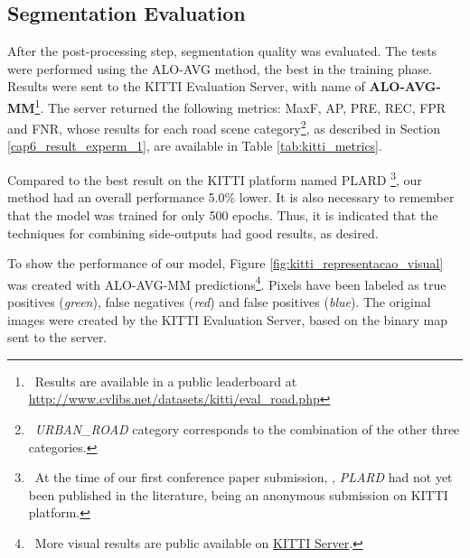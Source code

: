 \subsection{Segmentation Evaluation}
\label{cap6_resultados_segmentacao}

After the post-processing step, segmentation quality was evaluated.
The tests were performed using the ALO-AVG method, the best in the training phase.
Results were sent to  the KITTI Evaluation Server, with name of \textbf{ALO-AVG-MM}\footnote{~Results are available in a public leaderboard at \url{http://www.cvlibs.net/datasets/kitti/eval_road.php}}.
The server returned the following metrics: MaxF, AP, PRE, REC, FPR and FNR, whose results for each road scene category\footnote{~\textit{URBAN\_ROAD} category corresponds to the combination of the other three categories.}, as described in Section \ref{cap6_result_experm_1}, are available in Table \ref{tab:kitti_metrics}.



Compared to the best result on the KITTI platform named PLARD \cite{Chen:2019}\footnote{~At the time of our first conference paper submission, \cite{Reis:2019}, \textit{PLARD} had not yet been published in the literature, being an anonymous submission on KITTI platform.}, our method had an overall performance 5.0\% lower.
It is also necessary to remember that the model was trained for only 500 epochs.
Thus, it is indicated that the techniques for combining side-outputs had good results, as desired.

To show the performance of our model, Figure \ref{fig:kitti_representacao_visual} was created with ALO-AVG-MM predictions\footnote{~More visual results are public available on \href{http://www.cvlibs.net/datasets/kitti/eval_road_detail.php?result=a5ca173550cb383caf3e12ca236d7c809489d2d9}{KITTI Server}.}.
Pixels have been labeled as true positives (\textit{green}), false negatives (\textit{red}) and false positives (\textit{blue}).
The original images were created by the KITTI Evaluation Server, based on the binary map sent to the server.

